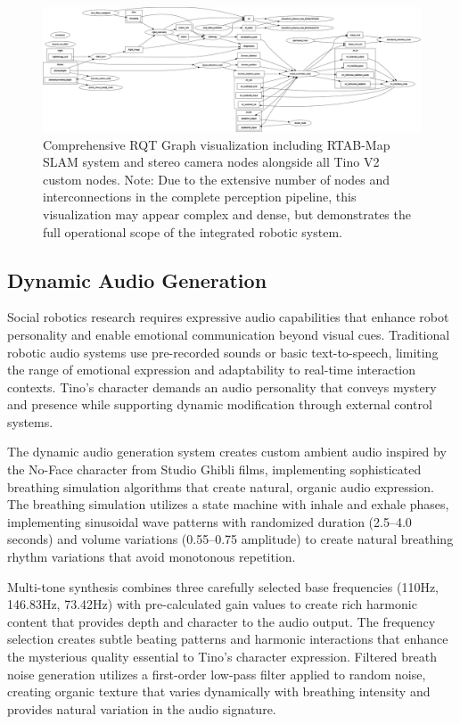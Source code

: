 \begin{figure}[H]
    \centering
    \includegraphics[width=\textwidth]{Images/TinoWithRTAB.png}
    \caption{Comprehensive RQT Graph visualization including RTAB-Map SLAM system and stereo camera nodes alongside all Tino V2 custom nodes. Note: Due to the extensive number of nodes and interconnections in the complete perception pipeline, this visualization may appear complex and dense, but demonstrates the full operational scope of the integrated robotic system.}
    \label{fig:rqt_complete_system_with_rtab}
\end{figure}

\subsection{Dynamic Audio Generation}

Social robotics research requires expressive audio capabilities that enhance robot personality and enable emotional communication beyond visual cues. Traditional robotic audio systems use pre-recorded sounds or basic text-to-speech, limiting the range of emotional expression and adaptability to real-time interaction contexts. Tino's character demands an audio personality that conveys mystery and presence while supporting dynamic modification through external control systems.

The dynamic audio generation system creates custom ambient audio inspired by the No-Face character from Studio Ghibli films, implementing sophisticated breathing simulation algorithms that create natural, organic audio expression. The breathing simulation utilizes a state machine with inhale and exhale phases, implementing sinusoidal wave patterns with randomized duration (2.5--4.0 seconds) and volume variations (0.55--0.75 amplitude) to create natural breathing rhythm variations that avoid monotonous repetition.

Multi-tone synthesis combines three carefully selected base frequencies (110Hz, 146.83Hz, 73.42Hz) with pre-calculated gain values to create rich harmonic content that provides depth and character to the audio output. The frequency selection creates subtle beating patterns and harmonic interactions that enhance the mysterious quality essential to Tino's character expression. Filtered breath noise generation utilizes a first-order low-pass filter applied to random noise, creating organic texture that varies dynamically with breathing intensity and provides natural variation in the audio signature.

